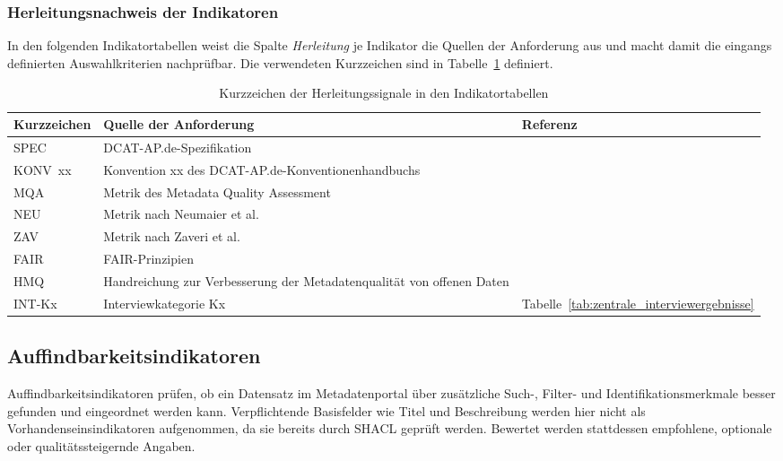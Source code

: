 \subsubsection{Herleitungsnachweis der Indikatoren}

In den folgenden Indikatortabellen weist die Spalte \textit{Herleitung} je Indikator die Quellen der Anforderung aus und macht damit die eingangs definierten Auswahlkriterien nachprüfbar. Die verwendeten Kurzzeichen sind in Tabelle~\ref{tab:herleitungssignale} definiert.

\begin{table}[H]
\centering
\scriptsize
\renewcommand{\arraystretch}{1.2}
\begin{tabular}{p{} p{} p{}}
\hline
\textbf{Kurzzeichen} & \textbf{Quelle der Anforderung} & \textbf{Referenz} \\
\hline
SPEC & DCAT-AP.de-Spezifikation & \cite{DCATAPDESpec3} \\
\hline
KONV~xx & Konvention xx des DCAT-AP.de-Konventionenhandbuchs & \cite{DCATAPDEImplRules2} \\
\hline
MQA & Metrik des Metadata Quality Assessment & \cite{data_europa, wentzel2023extensive} \\
\hline
NEU & Metrik nach Neumaier et al. & \cite{Neumaier2016MetadataQuality} \\
\hline
ZAV & Metrik nach Zaveri et al. & \cite{Zaveri2016LinkedDataQuality} \\
\hline
FAIR & FAIR-Prinzipien & \cite{wilkinson2016fair} \\
\hline
HMQ & Handreichung zur Verbesserung der Metadatenqualität von offenen Daten & \cite{bydata2025handreichung} \\
\hline
INT-Kx & Interviewkategorie Kx & Tabelle~\ref{tab:zentrale_interviewergebnisse} \\
\hline
\end{tabular}
\caption{Kurzzeichen der Herleitungssignale in den Indikatortabellen}
\label{tab:herleitungssignale}
\end{table}

\subsection{Auffindbarkeitsindikatoren}

Auffindbarkeitsindikatoren prüfen, ob ein Datensatz im Metadatenportal über zusätzliche Such-, Filter- und Identifikationsmerkmale besser gefunden und eingeordnet werden kann. Verpflichtende Basisfelder wie Titel und Beschreibung werden hier nicht als Vorhandenseinsindikatoren aufgenommen, da sie bereits durch SHACL geprüft werden. Bewertet werden stattdessen empfohlene, optionale oder qualitätssteigernde Angaben.

